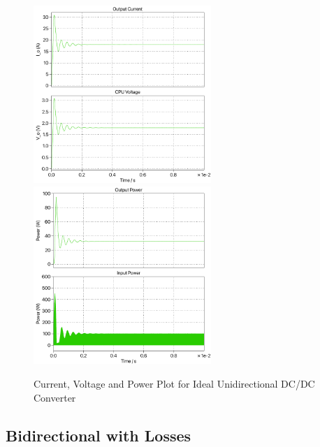 \documentclass{article}
\begin{document}
\begin{figure}[H]
    \centering{}
    \includegraphics[width=0.6\textwidth]{img/ideal-I-V-unidirectional.pdf}
    \includegraphics[width=0.6\textwidth]{img/ideal-power-unidirectional.pdf}
    \label{fig:ideal-uni-plots}
    \caption{Current, Voltage and Power Plot for Ideal Unidirectional DC/DC Converter}
\end{figure}

\subsection{Bidirectional with Losses}
\end{document}

